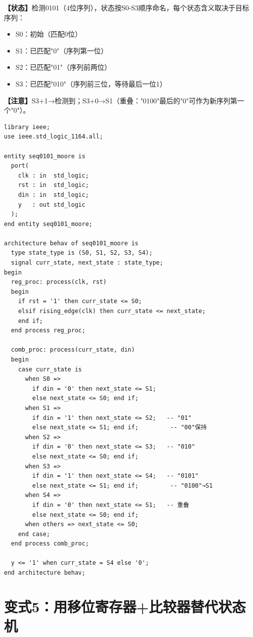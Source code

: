 \begin{detailbox}[完整教学]
\textbf{【状态】}检测0101（4位序列），状态按S0-S3顺序命名，每个状态含义取决于目标序列：
\begin{itemize}
  \item S0：初始（匹配0位）
  \item S1：已匹配"0"（序列第一位）
  \item S2：已匹配"01"（序列前两位）
  \item S3：已匹配"010"（序列前三位，等待最后一位1）
\end{itemize}
\textbf{【注意】}S3+1→检测到；S3+0→S1（重叠："0100"最后的"0"可作为新序列第一个"0"）。

\begin{lstlisting}[caption={0101序列检测器——Moore型可重叠（5状态）}]
library ieee;
use ieee.std_logic_1164.all;

entity seq0101_moore is
  port(
    clk : in  std_logic;
    rst : in  std_logic;
    din : in  std_logic;
    y   : out std_logic
  );
end entity seq0101_moore;

architecture behav of seq0101_moore is
  type state_type is (S0, S1, S2, S3, S4);
  signal curr_state, next_state : state_type;
begin
  reg_proc: process(clk, rst)
  begin
    if rst = '1' then curr_state <= S0;
    elsif rising_edge(clk) then curr_state <= next_state;
    end if;
  end process reg_proc;

  comb_proc: process(curr_state, din)
  begin
    case curr_state is
      when S0 =>
        if din = '0' then next_state <= S1;
        else next_state <= S0; end if;
      when S1 =>
        if din = '1' then next_state <= S2;   -- "01"
        else next_state <= S1; end if;         -- "00"保持
      when S2 =>
        if din = '0' then next_state <= S3;   -- "010"
        else next_state <= S0; end if;
      when S3 =>
        if din = '1' then next_state <= S4;   -- "0101"
        else next_state <= S1; end if;         -- "0100"→S1
      when S4 =>
        if din = '0' then next_state <= S1;   -- 重叠
        else next_state <= S0; end if;
      when others => next_state <= S0;
    end case;
  end process comb_proc;

  y <= '1' when curr_state = S4 else '0';
end architecture behav;
\end{lstlisting}
\end{detailbox}


\section{变式5：用移位寄存器+比较器替代状态机}

